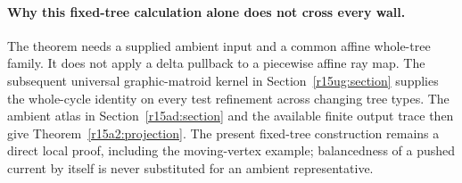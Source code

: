 \paragraph{Why this fixed-tree calculation alone does not cross every wall.}
The theorem needs a supplied ambient input and a common affine
whole-tree family. It does not apply a delta pullback to a
piecewise affine ray map. The subsequent universal graphic-matroid
kernel in Section~\ref{r15ug:section} supplies the whole-cycle
identity on every test refinement across changing tree types.
The ambient atlas in Section~\ref{r15ad:section} and the available
finite output trace then give Theorem~\ref{r15a2:projection}.
The present fixed-tree construction remains a direct local proof,
including the moving-vertex example; balancedness of a pushed
current by itself is never substituted for an ambient representative.
